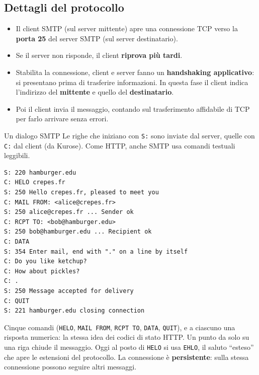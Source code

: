 
\subsection{Dettagli del protocollo}

\begin{itemize}
    \item Il client SMTP (sul server mittente) apre una connessione TCP verso la \textbf{porta 25} del server
          SMTP (sul server destinatario).
    \item Se il server non risponde, il client \textbf{riprova più tardi}.
    \item Stabilita la connessione, client e server fanno un \textbf{handshaking applicativo}: si presentano
          prima di trasferire informazioni. In questa fase il client indica l'indirizzo del \textbf{mittente} e
          quello del \textbf{destinatario}.
    \item Poi il client invia il messaggio, contando sul trasferimento affidabile di TCP per farlo arrivare
          senza errori.
\end{itemize}

\begin{esempio}{Un dialogo SMTP}
Le righe che iniziano con \texttt{S:} sono inviate dal server, quelle con \texttt{C:} dal client
(da Kurose). Come HTTP, anche SMTP usa comandi testuali leggibili.
\begin{lstlisting}
S: 220 hamburger.edu
C: HELO crepes.fr
S: 250 Hello crepes.fr, pleased to meet you
C: MAIL FROM: <alice@crepes.fr>
S: 250 alice@crepes.fr ... Sender ok
C: RCPT TO: <bob@hamburger.edu>
S: 250 bob@hamburger.edu ... Recipient ok
C: DATA
S: 354 Enter mail, end with "." on a line by itself
C: Do you like ketchup?
C: How about pickles?
C: .
S: 250 Message accepted for delivery
C: QUIT
S: 221 hamburger.edu closing connection
\end{lstlisting}
Cinque comandi (\texttt{HELO}, \texttt{MAIL FROM}, \texttt{RCPT TO}, \texttt{DATA}, \texttt{QUIT}), e a ciascuno una
risposta numerica: la stessa idea dei codici di stato HTTP. Un punto da solo su una riga chiude il messaggio.
Oggi al posto di \texttt{HELO} si usa \texttt{EHLO}, il saluto ``esteso'' che apre le estensioni del protocollo.
La connessione è \textbf{persistente}: sulla stessa connessione possono seguire altri messaggi.
\end{esempio}

